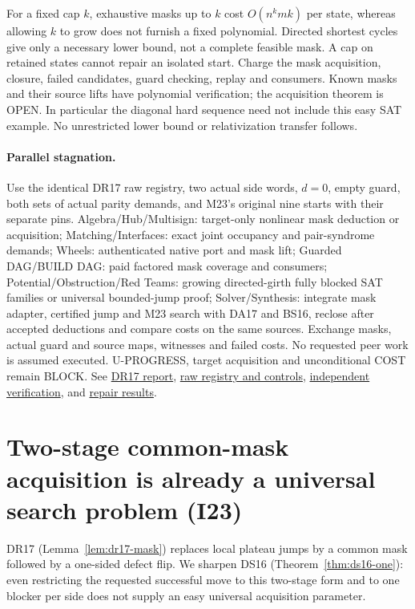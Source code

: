 \documentclass[11pt]{article}
\begin{document}
For a fixed cap $k$, exhaustive masks up to $k$ cost $O(n^k m k)$ per state, whereas allowing $k$ to grow does not furnish a fixed polynomial. Directed shortest cycles give only a necessary lower bound, not a complete feasible mask. A cap on retained states cannot repair an isolated start. Charge the mask acquisition, closure, failed candidates, guard checking, replay and consumers. Known masks and their source lifts have polynomial verification; the acquisition theorem is OPEN. In particular the diagonal hard sequence need not include this easy SAT example. No unrestricted lower bound or relativization transfer follows.

\paragraph{Parallel stagnation.}
Use the identical DR17 raw registry, two actual side words, $d=0$, empty guard, both sets of actual parity demands, and M23's original nine starts with their separate pins. Algebra/Hub/Multisign: target-only nonlinear mask deduction or acquisition; Matching/Interfaces: exact joint occupancy and pair-syndrome demands; Wheels: authenticated native port and mask lift; Guarded DAG/BUILD DAG: paid factored mask coverage and consumers; Potential/Obstruction/Red Teams: growing directed-girth fully blocked SAT families or universal bounded-jump proof; Solver/Synthesis: integrate mask adapter, certified jump and M23 search with DA17 and BS16, reclose after accepted deductions and compare costs on the same sources. Exchange masks, actual guard and source maps, witnesses and failed costs. No requested peer work is assumed executed. U-PROGRESS, target acquisition and unconditional COST remain BLOCK.
See \href{https://github.com/j15marti/pnp/commit/e8f5a8045b0c40bae0a1cd85074bd3d4bb80ccdd}{DR17 report}, \href{https://github.com/j15marti/pnp/commit/af8584879409ad3364795d50902f02b5a030bd2a}{raw registry and controls}, \href{https://github.com/j15marti/pnp/commit/c4b83149336a39fb21536d85da22143e2bec153c}{independent verification}, and \href{https://github.com/j15marti/pnp/commit/b7b7adc4b55a85d2d790bac6316414db4496dba5}{repair results}.


\section{Two-stage common-mask acquisition is already a universal search problem (I23)}\label{sec:i23}
DR17 (Lemma~\ref{lem:dr17-mask}) replaces local plateau jumps by a common mask followed by a one-sided defect flip. We sharpen DS16 (Theorem~\ref{thm:ds16-one}): even restricting the requested successful move to this two-stage form and to one blocker per side does not supply an easy universal acquisition parameter.
\end{document}
